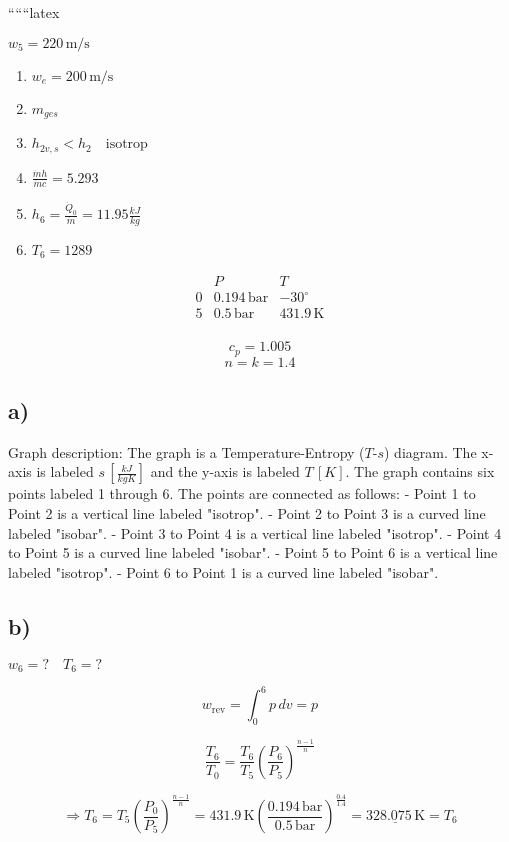 
``````latex


$w_5 = 220 \, \text{m/s}$

\begin{enumerate}
    \item $w_e = 200 \, \text{m/s}$
    \item $m_{ges}$
    \item $h_{2v,s} < h_2 \quad \text{isotrop}$
    \item $\frac{\dot{m}h}{\dot{m}c} = 5.293$
    \item $h_6 = \frac{\dot{Q}_0}{\dot{m}} = 11.95 \frac{kJ}{kg}$
    \item $T_6 = 1289$
\end{enumerate}

\[
\begin{array}{c|c|c}
 & P & T \\
\hline
0 & 0.194 \, \text{bar} & -30^\circ \\
5 & 0.5 \, \text{bar} & 431.9 \, \text{K} \\
\end{array}
\]

\[
c_p = 1.005
\]
\[
n = k = 1.4
\]

\subsection*{a)}
Graph description: The graph is a Temperature-Entropy ($T$-$s$) diagram. The x-axis is labeled $s \, \left[\frac{kJ}{kgK}\right]$ and the y-axis is labeled $T \, [K]$. The graph contains six points labeled 1 through 6. The points are connected as follows:
- Point 1 to Point 2 is a vertical line labeled "isotrop".
- Point 2 to Point 3 is a curved line labeled "isobar".
- Point 3 to Point 4 is a vertical line labeled "isotrop".
- Point 4 to Point 5 is a curved line labeled "isobar".
- Point 5 to Point 6 is a vertical line labeled "isotrop".
- Point 6 to Point 1 is a curved line labeled "isobar".

\subsection*{b)}
$w_6 = ? \quad T_6 = ?$

\[
w_{\text{rev}} = \int_0^6 p \, dv = p
\]

\[
\frac{T_6}{T_0} = \frac{T_6}{T_5} \left( \frac{P_6}{P_5} \right)^{\frac{n-1}{n}}
\]

\[
\Rightarrow T_6 = T_5 \left( \frac{P_0}{P_5} \right)^{\frac{n-1}{n}} = 431.9 \, \text{K} \left( \frac{0.194 \, \text{bar}}{0.5 \, \text{bar}} \right)^{\frac{0.4}{1.4}} = \underline{328.075 \, \text{K}} = T_6
\]

